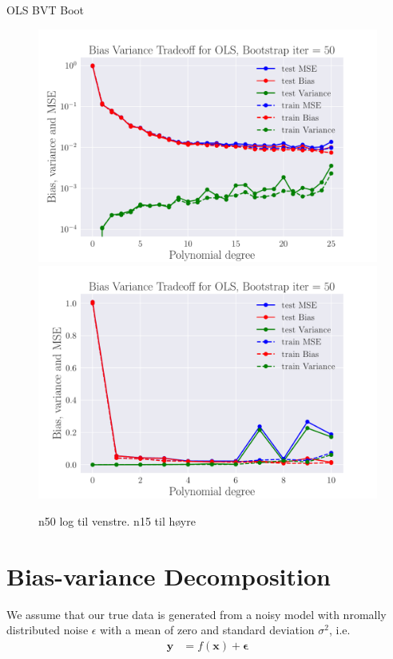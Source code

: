 \documentclass[reprint,english,notitlepage,aps,nobalancelastpage,nofootinbib]{revtex4-1}  %
\begin{document}
OLS BVT Boot
\begin{figure}[H]
	\includegraphics[width=\linewidth]{SRTM_BVT_OLS_n50_log.pdf}
	\endminipage\hfill
	\includegraphics[width=\linewidth]{SRTM_BVT_OLS_n15.pdf}
	\endminipage
	\caption{n50 log til venstre. n15 til høyre}
  \label{fig:terrain_OLS_BVT}
\end{figure}


\appendix


\section{Bias-variance Decomposition}\label{Apx:BVT}

We assume that our true data is generated from a noisy model with nromally distributed noise $\epsilon$ with a mean of zero and standard deviation $\sigma^2$, i.e.
\begin{align*}
  \mathbf{y} &= f(\mathbf{x}) + \bm{\epsilon}
\end{align*}
\end{document}
